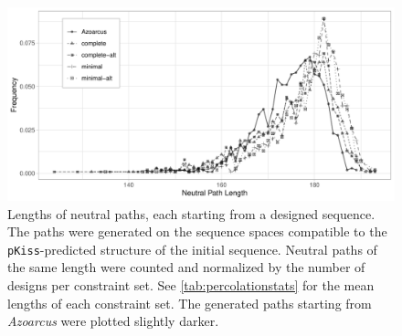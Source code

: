 \documentclass[../../master.tex]{subfiles}
\begin{document}
\begin{figure}[!ht]
	\centering
	\includegraphics[width=\textwidth]{pic/results/designs/npaths/hamming-freq-wide.pdf}
	\caption[Neutral Path Lengths]{
		Lengths of neutral paths, each starting from a designed sequence.
		The paths were generated on the sequence spaces compatible to the \texttt{pKiss}-predicted structure of the initial sequence.
		Neutral paths of the same length were counted and normalized by the number of designs per constraint set.
		See \autoref{tab:percolationstats} for the mean lengths of each constraint set.
		The generated paths starting from \textit{Azoarcus} were plotted slightly darker.
	}\label{fig:percolation}
\end{figure}
\end{document}
